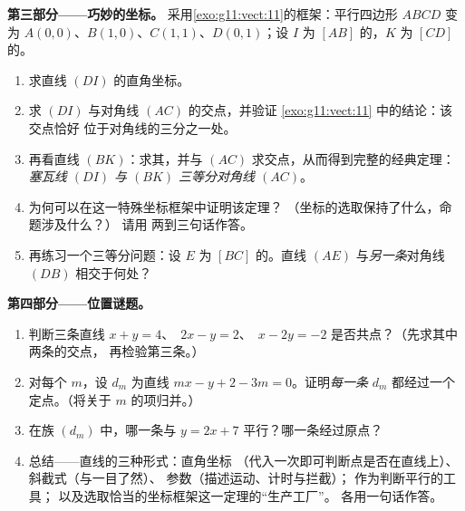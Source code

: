 \begin{problem}
\medskip
\noindent\textbf{第三部分——巧妙的坐标。}
采用\cref{exo:g11:vect:11}的框架：平行四边形
$ABCD$ 变为 $A(0,0)$、$B(1,0)$、$C(1,1)$、$D(0,1)$；设 $I$
为 $[AB]$ 的，$K$ 为 $[CD]$ 的。
\begin{enumerate}[resume]
  \item 求直线 $(DI)$ 的直角坐标。
  \item 求 $(DI)$ 与对角线 $(AC)$ 的交点，并验证
        \cref{exo:g11:vect:11} 中的结论：该交点恰好
        位于对角线的三分之一处。
  \item 再看直线 $(BK)$：求其，并与
        $(AC)$ 求交点，从而得到完整的经典定理：
        \emph{塞瓦线 $(DI)$ 与 $(BK)$ 三等分对角线
        $(AC)$}。
  \item 为何可以在这一特殊坐标框架中证明该定理？
        （坐标的选取保持了什么，命题涉及什么？）
        请用
        两到三句话作答。
  \item 再练习一个三等分问题：设 $E$ 为
        $[BC]$ 的。直线 $(AE)$
        与\emph{另一条}对角线 $(DB)$ 相交于何处？
\end{enumerate}

\medskip
\noindent\textbf{第四部分——位置谜题。}
\begin{enumerate}[resume]
  \item 判断三条直线 $x + y = 4$、\ $2x - y = 2$、\
        $x - 2y = -2$ 是否共点？（先求其中两条的交点，
        再检验第三条。）
  \item 对每个 $m$，设 $d_m$ 为直线
        $mx - y + 2 - 3m = 0$。证明\emph{每一条} $d_m$
        都经过一个定点。（将关于
        $m$ 的项归并。）
  \item 在族 $(d_m)$ 中，哪一条与
        $y = 2x + 7$ 平行？哪一条经过原点？
  \item 总结——直线的三种形式：直角坐标
        （代入一次即可判断点是否在直线上）、斜截式（与一目了然）、
        参数\omterm{def:g10:algebra:equation}{方程}（描述运动、计时与拦截）；
        作为判断平行的工具；
        以及选取恰当的坐标框架这一定理的“生产工厂”。
        各用一句话作答。
\end{enumerate}
\end{problem}
